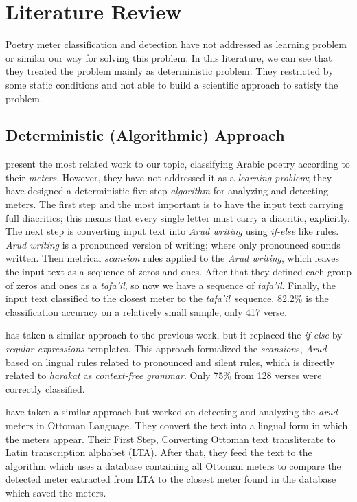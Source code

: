 \section{Literature Review}\label{Ch:Literature}

Poetry meter classification and detection have not addressed as learning problem or similar our way for solving this problem. In this literature, we can see that they treated the problem mainly as  deterministic problem. They restricted by some static conditions and not able to build a scientific approach to satisfy the problem.

  
%
\subsection{Deterministic (Algorithmic) Approach}\label{sec:Determ_Algor_Appr}

\cite{Abuata2016RuleBasedAlgorithmFor} present the most related work to our topic, classifying Arabic poetry according to their \textit{meters}. However, they have not addressed it as a \textit{learning problem}; they have designed a deterministic five-step \textit{algorithm} for analyzing and detecting meters. The first step and the most important is to have the input text carrying full diacritics; this means that every single letter must carry a diacritic, explicitly. The next step is converting input text into \textit{Arud writing} using \textit{if-else} like rules. \textit{Arud writing} is a pronounced version of writing; where only pronounced sounds written. Then metrical \textit{scansion} rules applied to the \textit{Arud writing}, which leaves the input text as a sequence of zeros and ones. After that they defined each group of zeros and ones as a \textit{tafa'il}, so now we have a sequence of \textit{tafa'il}. Finally, the input text classified to the closest meter to the \textit{tafa'il} sequence. 82.2\% is the classification accuracy on a relatively small sample, only 417 verse.

\cite{Alnagdawi2013FindingArabicPoemMeter} has taken a similar approach to the previous work, but it replaced the \textit{if-else} by \textit{regular expressions} templates. This approach formalized the \textit{scansion}s, \textit{Arud} based on lingual rules related to pronounced and silent rules, which is directly related to \textit{harakat} as \textit{context-free grammar}. Only 75\% from 128 verses were correctly classified. 

\cite{Kurt2012AlgorithmForDetectionAnalysis} have taken a similar approach but worked on detecting and analyzing the \textit{arud} meters in Ottoman Language. They convert the text into a lingual form in which the meters appear. Their First Step, Converting Ottoman text transliterate to Latin transcription alphabet (LTA). After that, they feed the text to the algorithm which uses a database containing all Ottoman meters to compare the detected meter extracted from LTA to the closest meter found in the database which saved the meters.

